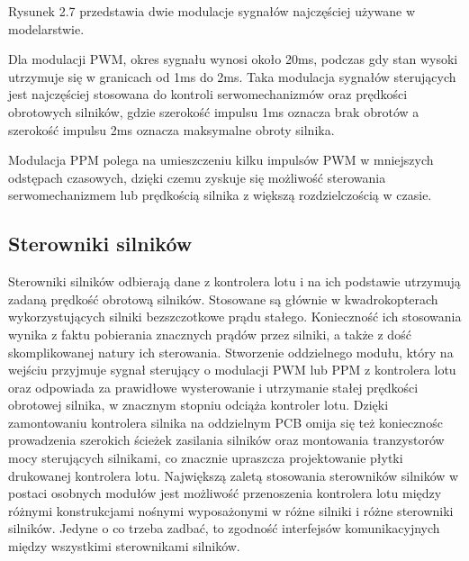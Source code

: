 Rysunek 2.7 przedstawia dwie modulacje sygnałów najczęściej używane w modelarstwie. 

Dla modulacji PWM, okres sygnału wynosi około 20ms, podczas gdy stan wysoki utrzymuje się w granicach od 1ms do 2ms. Taka modulacja sygnałów sterujących jest najczęściej stosowana do kontroli serwomechanizmów oraz prędkości obrotowych silników, gdzie szerokość impulsu 1ms oznacza brak obrotów a szerokość impulsu 2ms oznacza maksymalne obroty silnika. 

Modulacja PPM polega na umieszczeniu kilku impulsów PWM w mniejszych odstępach czasowych, dzięki czemu zyskuje się możliwość sterowania serwomechanizmem lub prędkością silnika z większą rozdzielczością w czasie.


\subsection{Sterowniki silników}

Sterowniki silników odbierają dane z kontrolera lotu i na ich podstawie utrzymują zadaną prędkość obrotową silników. Stosowane są głównie w kwadrokopterach wykorzystujących silniki bezszczotkowe prądu stałego. Konieczność ich stosowania wynika z faktu pobierania znacznych prądów przez silniki, a także z dość skomplikowanej natury ich sterowania. Stworzenie oddzielnego modułu, który na wejściu przyjmuje sygnał sterujący o modulacji PWM lub PPM z kontrolera lotu oraz odpowiada za prawidłowe wysterowanie i utrzymanie stałej prędkości obrotowej silnika, w znacznym stopniu odciąża kontroler lotu. Dzięki zamontowaniu kontrolera silnika na oddzielnym PCB omija się też koniecznośc prowadzenia szerokich ścieżek zasilania silników oraz montowania tranzystorów mocy sterujących silnikami, co znacznie upraszcza projektowanie płytki drukowanej kontrolera lotu. Największą zaletą stosowania sterowników silników w postaci osobnych modułów jest możliwość przenoszenia kontrolera lotu między różnymi konstrukcjami nośnymi wyposażonymi w różne silniki i różne sterowniki silników. Jedyne o co trzeba zadbać, to zgodność interfejsów komunikacyjnych między wszystkimi sterownikami silników. 

